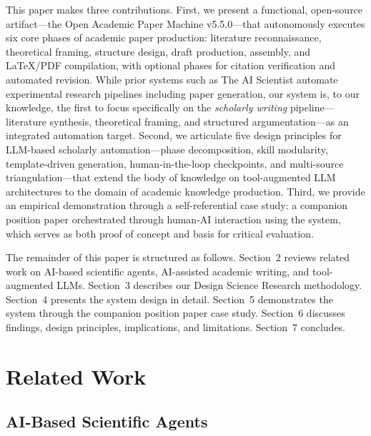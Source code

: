 \documentclass{article}
\begin{document}
This paper makes three contributions. First, we present a functional, open-source artifact---the Open Academic Paper Machine v5.5.0---that autonomously executes six core phases of academic paper production: literature reconnaissance, theoretical framing, structure design, draft production, assembly, and \LaTeX/PDF compilation, with optional phases for citation verification and automated revision. While prior systems such as The AI Scientist \citep{lu2024ai_scientist} automate experimental research pipelines including paper generation, our system is, to our knowledge, the first to focus specifically on the \emph{scholarly writing} pipeline---literature synthesis, theoretical framing, and structured argumentation---as an integrated automation target. Second, we articulate five design principles for LLM-based scholarly automation---phase decomposition, skill modularity, template-driven generation, human-in-the-loop checkpoints, and multi-source triangulation---that extend the body of knowledge on tool-augmented LLM architectures to the domain of academic knowledge production. Third, we provide an empirical demonstration through a self-referential case study: a companion position paper \citep{blask2026creator} orchestrated through human-AI interaction using the system, which serves as both proof of concept and basis for critical evaluation.

The remainder of this paper is structured as follows. Section~2 reviews related work on AI-based scientific agents, AI-assisted academic writing, and tool-augmented LLMs. Section~3 describes our Design Science Research methodology. Section~4 presents the system design in detail. Section~5 demonstrates the system through the companion position paper case study. Section~6 discusses findings, design principles, implications, and limitations. Section~7 concludes.


\section{Related Work}

\subsection{AI-Based Scientific Agents}
\end{document}
